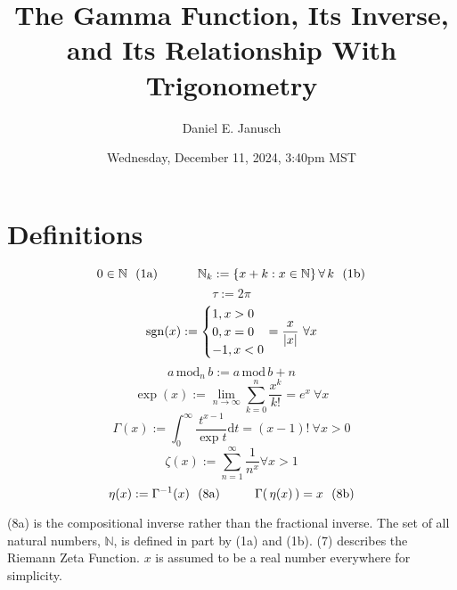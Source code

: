 \documentclass[12pt]{article}
\providecommand \dt {\mathrm dt}
\providecommand \pgrp [1] {\left( #1 \right)}   %
\providecommand \cgrp [1] {\left\{ #1 \right\}} %
\providecommand \setN {\mathbb N}
\providecommand \sgnf [1]{\mathrm{sgn}\!\pgrp{#1}}
\providecommand \hpx  [1] {\hspace{#1px}}
\providecommand \nhpx [1] {\hspace{-#1px}}
\providecommand \nvpx [1] {\vspace{-#1px}}
\begin{document}
\title{The Gamma Function, Its Inverse, and Its Relationship With Trigonometry}
\author{Daniel E. Janusch}
\date{Wednesday, December 11, 2024, 3:40pm MST}
\maketitle

\section{Definitions}

\begin{equation}
	0 \in \setN ~~ (1\text a) \hpx{32}
	\setN_k := \cgrp{x + k : x \in \setN} \forall \,k~~(1\text b)
\end{equation} %
\nvpx 1
\begin{equation}
	\tau := 2\pi
\end{equation} %
\nvpx 1
\begin{equation}
	\sgnf{x} := \begin{cases}
		1, x > 0 \\
		0, x = 0 \\
		-1, x < 0
	\end{cases}\nhpx{10} = \dfrac x{|x|} ~ \forall x
\end{equation} %
\nvpx 1
\begin{equation}
	a \,\text{mod}_n\, b := a \,\text{mod}\, b + n
\end{equation} %
\nvpx 1
\begin{equation}
	\exp(x) := \lim_{n\to\infty} \sum_{k=0}^n \dfrac{x^k}{k!} = e^x ~ \forall x
\end{equation} %
\nvpx 1
\begin{equation}
	\Gamma(x) := \int_0^\infty \dfrac{t^{x-1}}{\exp t} \dt = (x-1)! ~ \forall x > 0
\end{equation} %
\nvpx 1
\begin{equation}
	\zeta(x) := \sum_{n=1}^\infty \dfrac 1{n^x} \forall x > 1
\end{equation} %
\nvpx 1
\begin{equation}
	\eta(x) := \Gamma^{-1}(x)~~(8\text a) \hpx{28}
	\Gamma(\,\eta(x)\,) = x~~(8\text b)
\end{equation} %

\noindent (8a) is the compositional inverse rather than the fractional inverse.
The set of all natural numbers, $\setN$, is defined in part by (1a) and
(1b). (7) describes the Riemann Zeta Function. $x$ is assumed to be a real
number everywhere for simplicity.
\end{document}

